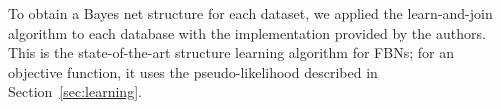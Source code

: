 \documentclass[oribibl]{llncs}
\begin{document}

To obtain a Bayes net structure for each dataset, we applied the learn-and-join algorithm \cite{Schulte2012} to each database with the implementation provided by the authors. This is the state-of-the-art structure learning algorithm for FBNs;  for an objective function, it uses the pseudo-likelihood described in Section~\ref{sec:learning}. 


%

%
%
%
\end{document}
